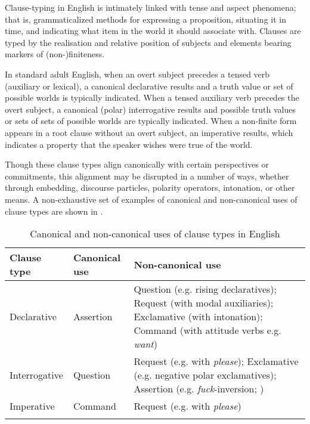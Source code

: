 \documentclass[output=paper,colorlinks,citecolor=brown]{langscibook}
\begin{document}
Clause-typing in English is intimately linked with tense and aspect phenomena; that is, grammaticalized methods for expressing a proposition, situating it in time, and indicating what item in the world it should associate with. Clauses are typed by the realisation and relative position of subjects and elements bearing markers of (non-)finiteness. 

In standard adult English, when an overt subject precedes a tensed verb (auxiliary or lexical), a canonical declarative results and a truth value or set of possible worlds is typically indicated. When a tensed auxiliary verb precedes the overt subject, a canonical (polar) interrogative results and possible truth values or sets of sets of possible worlds are typically indicated. When a non-finite form appears in a root clause without an overt subject, an imperative results, which indicates a property that the speaker wishes were true of the world. 

Though these clause types align canonically with certain perspectives or commitments, this alignment may be disrupted in a number of ways, whether through embedding, discourse particles, polarity operators, intonation, or other means. A non-exhaustive set of examples of canonical and non-canonical uses of clause types are shown in .

\begin{table}
\begin{tabularx}{\textwidth}{llQ}
  \lsptoprule
  Clause type & Canonical use & Non-canonical use \\
  \midrule
  Declarative  &  Assertion  &  Question (e.g. rising declaratives); Request (with modal auxiliaries); Exclamative (with intonation); Command (with attitude verbs e.g. \textit{want})  \\
\midrule
  Interrogative  &  Question & Request (e.g. with \textit{please}); Exclamative (e.g. negative polar exclamatives); Assertion (e.g. \textit{fuck}-inversion; \citealt{sailor2020})  \\
\midrule
  Imperative  &  Command  &  Request (e.g. with \textit{please})  \\
   \lspbottomrule
 \end{tabularx}
 \caption{Canonical and non-canonical uses of clause types in English}
\label{tab:clausetypes}
\end{table}
\end{document}
